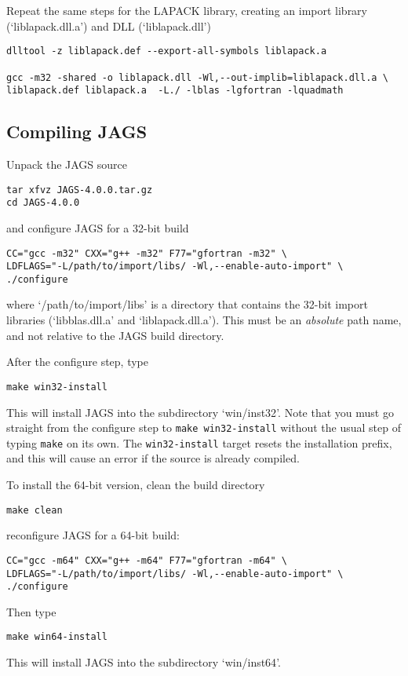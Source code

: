 \documentclass[11pt, a4paper, titlepage]{article}
\newcommand{\JAGS}{\textsf{JAGS}}
\newcommand{\file}[1]{{`\normalfont\textsf{#1}'}}
\begin{document}
Repeat the same steps for the LAPACK library, creating an import library
(\file{liblapack.dll.a}) and DLL (\file{liblapack.dll})
\begin{verbatim}
dlltool -z liblapack.def --export-all-symbols liblapack.a

gcc -m32 -shared -o liblapack.dll -Wl,--out-implib=liblapack.dll.a \
liblapack.def liblapack.a  -L./ -lblas -lgfortran -lquadmath
\end{verbatim}

\subsection{Compiling \JAGS}

Unpack the JAGS source
\begin{verbatim}
tar xfvz JAGS-4.0.0.tar.gz
cd JAGS-4.0.0
\end{verbatim}
and configure JAGS for a 32-bit build
\begin{verbatim}
CC="gcc -m32" CXX="g++ -m32" F77="gfortran -m32" \
LDFLAGS="-L/path/to/import/libs/ -Wl,--enable-auto-import" \
./configure
\end{verbatim}
where \file{/path/to/import/libs} is a directory that contains the
32-bit import libraries (\file{libblas.dll.a} and
\file{liblapack.dll.a}).  This must be an {\em absolute} path name,
and not relative to the JAGS build directory.

After the configure step, type
\begin{verbatim}
make win32-install
\end{verbatim}
This will install JAGS into the subdirectory \file{win/inst32}.
Note that you must go straight from the configure step to \texttt{make
  win32-install} without the usual step of typing \texttt{make} on
its own.  The \texttt{win32-install} target resets the installation
prefix, and this will cause an error if the source is already
compiled.

To install the 64-bit version, clean the build directory 
\begin{verbatim}
make clean 
\end{verbatim}
reconfigure JAGS for a 64-bit build:
\begin{verbatim}
CC="gcc -m64" CXX="g++ -m64" F77="gfortran -m64" \
LDFLAGS="-L/path/to/import/libs/ -Wl,--enable-auto-import" \
./configure
\end{verbatim}
Then type
\begin{verbatim}
make win64-install
\end{verbatim}
This will install JAGS into the subdirectory \file{win/inst64}.
\end{document}
